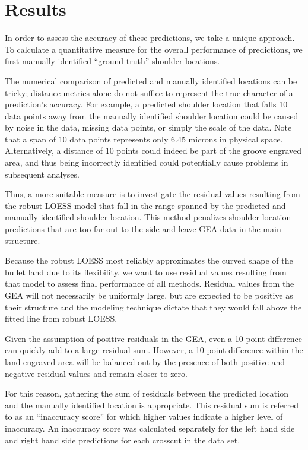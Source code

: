 \documentclass[]{article}
\begin{document}
\section{Results}

In order to assess the accuracy of these predictions, we take a unique
approach. To calculate a quantitative measure for the overall
performance of predictions, we first manually identified ``ground
truth'' shoulder locations.

The numerical comparison of predicted and manually identified locations
can be tricky; distance metrics alone do not suffice to represent the
true character of a prediction's accuracy. For example, a predicted
shoulder location that falls 10 data points away from the manually
identified shoulder location could be caused by noise in the data,
missing data points, or simply the scale of the data. Note that a span
of 10 data points represents only 6.45 microns in physical space.
Alternatively, a distance of 10 points could indeed be part of the
groove engraved area, and thus being incorrectly identified could
potentially cause problems in subsequent analyses.

Thus, a more suitable measure is to investigate the residual values
resulting from the robust LOESS model that fall in the range spanned by
the predicted and manually identified shoulder location. This method
penalizes shoulder location predictions that are too far out to the side
and leave GEA data in the main structure.

Because the robust LOESS most reliably approximates the curved shape of
the bullet land due to its flexibility, we want to use residual values
resulting from that model to assess final performance of all methods.
Residual values from the GEA will not necessarily be uniformly large,
but are expected to be positive as their structure and the modeling
technique dictate that they would fall above the fitted line from robust
LOESS.

Given the assumption of positive residuals in the GEA, even a 10-point
difference can quickly add to a large residual sum. However, a 10-point
difference within the land engraved area will be balanced out by the
presence of both positive and negative residual values and remain closer
to zero.

For this reason, gathering the sum of residuals between the predicted
location and the manually identified location is appropriate. This
residual sum is referred to as an ``inaccuracy score'' for which higher
values indicate a higher level of inaccuracy. An inaccuracy score was
calculated separately for the left hand side and right hand side
predictions for each crosscut in the data set.
\end{document}
